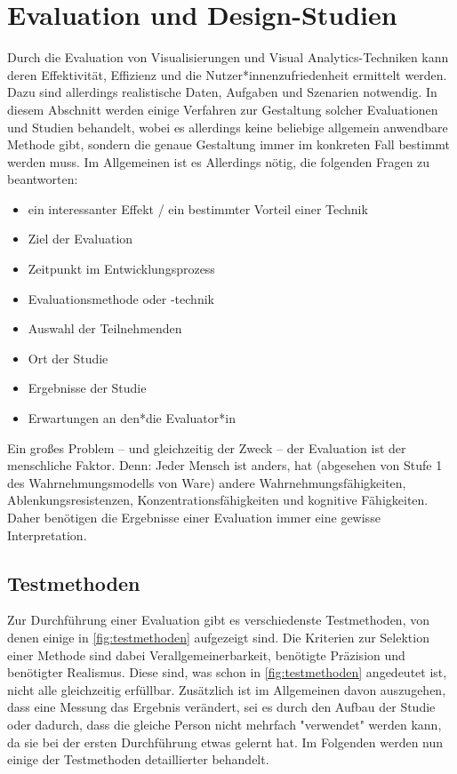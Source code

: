	\section{Evaluation und Design-Studien} %
		Durch die Evaluation von Visualisierungen und Visual Analytics-Techniken kann deren Effektivität, Effizienz und die Nutzer*innenzufriedenheit ermittelt werden. Dazu sind allerdings realistische Daten, Aufgaben und Szenarien notwendig. In diesem Abschnitt werden einige Verfahren zur Gestaltung solcher Evaluationen und Studien behandelt, wobei es allerdings keine beliebige allgemein anwendbare Methode gibt, sondern die genaue Gestaltung immer im konkreten Fall bestimmt werden muss. Im Allgemeinen ist es Allerdings nötig, die folgenden Fragen zu beantworten:
		\begin{itemize}
			\item {} ein interessanter Effekt / ein bestimmter Vorteil einer Technik
			\item {} Ziel der Evaluation
			\item {}  Zeitpunkt im Entwicklungsprozess
			\item {}   Evaluationsmethode oder -technik
			\item {}   Auswahl der Teilnehmenden
			\item {}    Ort der Studie
			\item {} Ergebnisse der Studie
			\item {}   Erwartungen an den*die Evaluator*in
		\end{itemize}
		Ein großes Problem -- und gleichzeitig der Zweck -- der Evaluation ist der menschliche Faktor. Denn: Jeder Mensch ist anders, hat (abgesehen von Stufe 1 des Wahrnehmungsmodells von Ware) andere Wahrnehmungsfähigkeiten, Ablenkungsresistenzen, Konzentrationsfähigkeiten und kognitive Fähigkeiten. Daher benötigen die Ergebnisse einer Evaluation immer eine gewisse Interpretation.

		\subsection{Testmethoden}
			Zur Durchführung einer Evaluation gibt es verschiedenste Testmethoden, von denen einige in \autoref{fig:testmethoden} aufgezeigt sind. Die Kriterien zur Selektion einer Methode sind dabei \bspw Verallgemeinerbarkeit, benötigte Präzision und benötigter Realismus. Diese sind, was schon in \autoref{fig:testmethoden} angedeutet ist, nicht alle gleichzeitig erfüllbar. Zusätzlich ist im Allgemeinen davon auszugehen, dass eine Messung das Ergebnis verändert, sei es durch den Aufbau der Studie oder dadurch, dass die gleiche Person nicht mehrfach "verwendet" werden kann, da sie bei der ersten Durchführung etwas gelernt hat. Im Folgenden werden nun einige der Testmethoden detaillierter behandelt.

